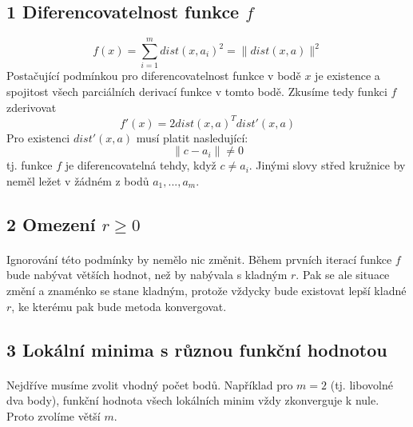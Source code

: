 \documentclass[11pt]{article}
\begin{document}
\subsection*{1 Diferencovatelnost funkce $f$}
$$f(x) = \sum_{i = 1}^{m} dist(x, a_{i})^{2} = \|dist(x, a)\|^{2}$$
Postačující podmínkou pro diferencovatelnost funkce v bodě $x$ je existence a spojitost všech parciálních derivací funkce v tomto bodě. Zkusíme tedy funkci $f$ zderivovat
$$ f'(x) = 2 dist(x, a)^{T} dist'(x, a)$$
Pro existenci $dist'(x, a)$ musí platit nasledující: 
$$ \|c-a_{i}\| \neq 0$$ tj. funkce $f$ je diferencovatelná tehdy, když $c \neq a_{i}$. Jinými slovy střed kružnice by neměl ležet v žádném z bodů $a_{1},...,a_{m}$.


\subsection*{2 Omezení $r \geq 0$}
\paragraph{}
Ignorování této podmínky by nemělo nic změnit. Během prvních iterací funkce $f$  bude nabývat větších hodnot, než by nabývala s kladným $r$.  Pak se ale situace změní a znaménko se stane kladným, protože vždycky bude existovat lepší kladné $r$, ke kterému pak bude metoda konvergovat.


\subsection*{3 Lokální minima s různou funkční hodnotou}
\paragraph{}
Nejdříve musíme zvolit vhodný počet bodů. Například pro $ m = 2 $ (tj. libovolné dva body), funkční hodnota všech lokálních minim vždy zkonverguje k nule. Proto zvolíme větší $m$.
\end{document}
